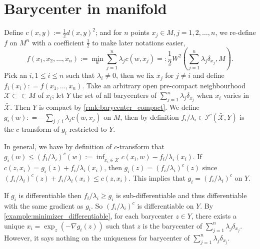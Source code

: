 \section{Barycenter in manifold}

\label{section:barycenter_manifold}
Define $c(x, y):=\frac{1}{2} d(x, y)^2$;
and for $n$ points $x_j \in M, j=1,2,\ldots,n$, we re-define $f$ on $M^n$ with a coefficient $\frac{1}{2}$
to make later notations easier,
\[
	f(x_1, x_2, \ldots, x_n) := \min_{w} \sum_{j=1}^n \lambda_j c(w, x_j) =: \frac{1}{2}W^2(\sum_{j=1}^n \lambda_j \delta_{x_j}, M).
\]
Pick an $i, 1 \leq i \leq n$ such that $\lambda_i \neq 0$, then we fix $x_j$ for $j \neq i$ and
define $f_i (x_i) : = f(x_1, \ldots, x_n)$.
Take an arbitrary open pre-compact neighbourhood $\mathcal{X} \subset \subset M$ of $x_i$;
let $Y$ the set of all barycenters of $\sum_{j=1}^n \lambda_j \delta_{x_j}$
when $x_i$ varies in $\bar{ \mathcal{X} }$.
Then $Y$ is compact by \cref{rmk:barycenter_compact}.
We define $g_i(w): = -\sum_{j \neq i} \lambda_j c(w, x_j)$ on $M$,
then by definition $f_i /\lambda_i \in \mathcal{I}^c (\bar{ \mathcal{X}}, Y)$
is the $c$-transform of
$g_i$ restricted to $Y$.
\begin{rmk}
	In general, we have by definition of $c$-transform that
	$g_i(w) \leq (f_i / \lambda_i)^c(w) := \inf_{x_i \in \bar{ \mathcal{X} } } c(x_i, w) - f_i / \lambda_i (x_i)$.
	If $ c(z, x_i) = g_i (z) + f_i / \lambda_i (x_i)$,
	then
	$g_i(z) = (f_i / \lambda_i)^c (z)$ since $(f_i / \lambda_i)^c(z) + f_i / \lambda_i(x_i) \leq c (z, x_i)$.
	This implies that $g_i = (f_i / \lambda_i)^c$ on $Y$.

	If $g_i$ is differentiable then $f_i / \lambda_i \geq g_i$ is sub-differentiable
	and thus differentiable with the same gradient as $g_i$.
	So $(f_i / \lambda_i)^c$ is differentiable on $Y$.
	By \cref{example:minimizer_differentiable}, for each barycenter $z \in Y$,
	there exists a unique $x_i = \exp_z (- \nabla g_i (z))$ such that $z$ is the barycenter
	of $\sum_{j=1}^n \lambda_j \delta_{x_j}$.
	However, it says nothing on the uniqueness for barycenter of $\sum_{j=1}^n \lambda_j \delta_{x_j}$.

\end{rmk}

